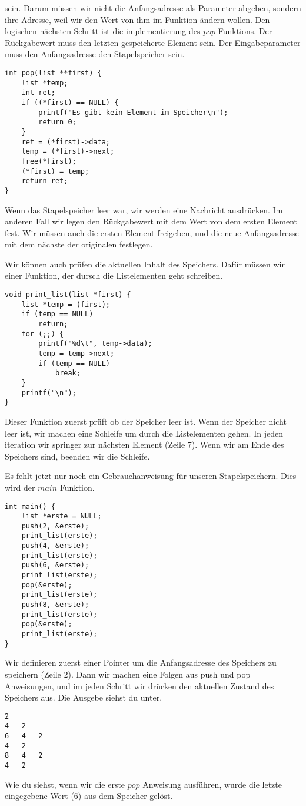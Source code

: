 \documentclass{article}[12pt]
\begin{document}
sein. Darum müssen wir nicht die Anfangsadresse als Parameter abgeben, sondern ihre Adresse,
weil wir den Wert von ihm im Funktion ändern wollen. Den logischen nächsten Schritt
ist die implementierung des $pop$ Funktions. Der Rückgabewert muss den letzten gespeicherte
Element sein. Der Eingabeparameter muss den Anfangsadresse den Stapelspeicher sein.
\begin{lstlisting}
int pop(list **first) {
    list *temp;
    int ret;
    if ((*first) == NULL) {
        printf("Es gibt kein Element im Speicher\n");
        return 0;
    }
    ret = (*first)->data;
    temp = (*first)->next;
    free(*first);
    (*first) = temp;
    return ret;
}
\end{lstlisting}
Wenn das Stapelspeicher leer war, wir werden eine Nachricht ausdrücken. 
Im anderen Fall wir legen den Rückgabewert mit dem Wert von dem ersten 
Element fest. Wir müssen auch die ersten Element freigeben, und die neue
Anfangsadresse mit dem nächste der originalen festlegen.

Wir können auch prüfen die aktuellen Inhalt des Speichers. 
Dafür müssen wir einer Funktion, der dursch die Listelementen geht
schreiben.
\begin{lstlisting}
void print_list(list *first) {
    list *temp = (first);
    if (temp == NULL)
        return;
    for (;;) {
        printf("%d\t", temp->data);
        temp = temp->next;
        if (temp == NULL)
            break;
    }
    printf("\n");
}
\end{lstlisting}
Dieser Funktion zuerst prüft ob der Speicher leer ist. Wenn der
Speicher nicht leer ist, wir machen eine Schleife um durch die
Listelementen gehen. In jeden iteration wir springer zur 
nächsten Element (Zeile 7). Wenn wir am Ende des Speichers
sind, beenden wir die Schleife.

Es fehlt jetzt nur noch ein Gebrauchanweisung für unseren Stapelspeichern.
Dies wird der $main$ Funktion.
\begin{lstlisting}
int main() {
    list *erste = NULL;
    push(2, &erste);
    print_list(erste);
    push(4, &erste);
    print_list(erste);
    push(6, &erste);
    print_list(erste);
    pop(&erste);
    print_list(erste);
    push(8, &erste);
    print_list(erste);
    pop(&erste);
    print_list(erste);
}
\end{lstlisting}
Wir definieren zuerst einer Pointer um die 
Anfangsadresse des Speichers zu speichern (Zeile 2). Dann wir machen eine
Folgen aus push und pop Anweisungen, und im jeden Schritt wir drücken
den aktuellen Zustand des Speichers aus. Die Ausgebe siehst du unter.
\begin{lstlisting}
2	
4	2	
6	4	2	
4	2	
8	4	2	
4	2	
\end{lstlisting}
Wie du siehst, wenn wir die erste $pop$ Anweisung ausführen, wurde die letzte 
eingegebene Wert (6) aus dem Speicher gelöst. 
\end{document}
